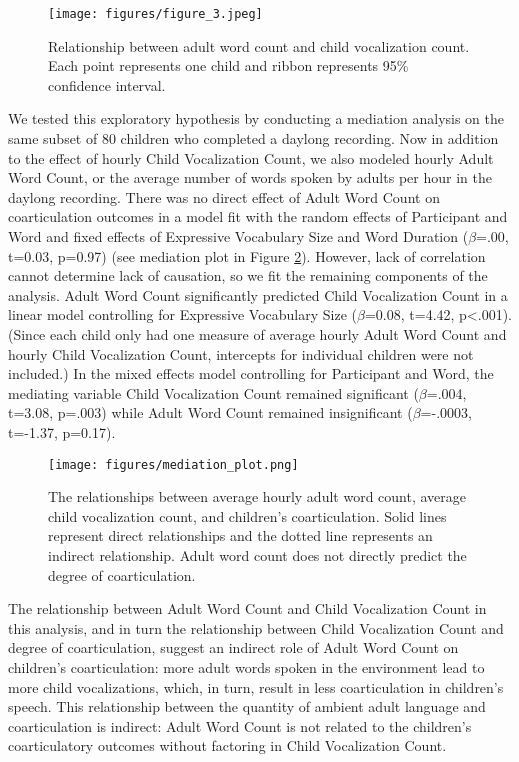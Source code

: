 \documentclass[a4paper,man,natbib,donotrepeattitle, apacite]{apa6}
\begin{document}
\begin{figure}[H]
\centering
\texttt{[image: figures/figure\_3.jpeg]}
\caption{\label{fig:figure-3}Relationship between adult word count and child vocalization count. Each point represents one child and ribbon represents 95\% confidence interval.}
\end{figure}

We tested this exploratory hypothesis by conducting a mediation analysis on the same subset of 80 children who completed a daylong recording. Now in addition to the effect of hourly Child Vocalization Count, we also modeled hourly Adult Word Count, or the average number of words spoken by adults per hour in the daylong recording. There was no direct effect of Adult Word Count on coarticulation outcomes in a model fit with the random effects of Participant and Word and fixed effects of Expressive Vocabulary Size and Word Duration ($\beta$=.00, t=0.03, p=0.97) (see mediation plot in Figure \ref{fig:mediation}). However, lack of correlation cannot determine lack of causation, so we fit the remaining components of the analysis. Adult Word Count significantly predicted Child Vocalization Count in a linear model controlling for Expressive Vocabulary Size ($\beta$=0.08, t=4.42, p<.001). (Since each child only had one measure of average hourly Adult Word Count and hourly Child Vocalization Count, intercepts for individual children were not included.) In the mixed effects model controlling for Participant and Word, the mediating variable Child Vocalization Count remained significant ($\beta$=.004, t=3.08, p=.003) while Adult Word Count remained insignificant ($\beta$=-.0003, t=-1.37, p=0.17). 

\begin{figure}[H]
\centering
\texttt{[image: figures/mediation\_plot.png]}
\caption{\label{fig:mediation}The relationships between average hourly adult word count, average child vocalization count, and children's coarticulation. Solid lines represent direct relationships and the dotted line represents an indirect relationship. Adult word count does not directly predict the degree of coarticulation.}
\end{figure}

The relationship between Adult Word Count and Child Vocalization Count in this analysis, and in turn the relationship between Child Vocalization Count and degree of coarticulation, suggest an indirect role of Adult Word Count on children’s coarticulation: more adult words spoken in the environment lead to more child vocalizations, which, in turn, result in less coarticulation in children's speech. This relationship between the quantity of ambient adult language and coarticulation is indirect: Adult Word Count is not related to the children’s coarticulatory outcomes without factoring in Child Vocalization Count.  
\end{document}
